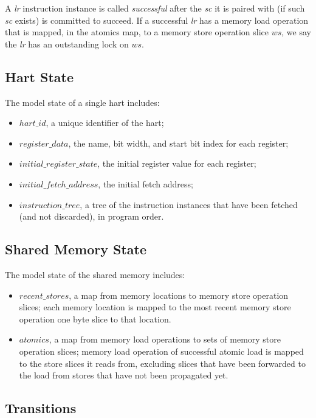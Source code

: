 A {\em lr} instruction instance is called {\em successful} after the {\em sc} it is paired with (if such {\em sc} exists) is committed to succeed.
If a successful {\em lr} has a memory load operation that is mapped, in the atomics map, to a memory store operation slice $ws$, we say the {\em lr} has an outstanding lock on $ws$. 


\subsection{Hart State}
The model state of a single hart includes:
\begin{itemize}
\item $hart\_id$, a unique identifier of the hart;
\item $register\_data$, the name, bit width, and start bit index for each register;
\item $initial\_register\_state$, the initial register value for each register;
\item $initial\_fetch\_address$, the initial fetch address;
\item $instruction\_tree$, a tree of the instruction instances that have been fetched (and not discarded), in program order.
\end{itemize}


\subsection{Shared Memory State}
The model state of the shared memory includes:
\begin{itemize}
\item $recent\_stores$, a map from memory locations to memory store operation slices;
each memory location is mapped to the most recent memory store operation one byte slice to that location.
\item $atomics$, a map from memory load operations to sets of memory store operation slices;
memory load operation of successful atomic load is mapped to the store slices it reads from, excluding slices that have been forwarded to the load from stores that have not been propagated yet.
\end{itemize}


\subsection{Transitions}\label{sec:omm:transitions}

